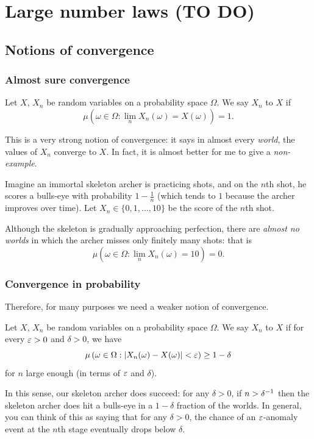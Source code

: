 \chapter{Large number laws (TO DO)}
\label{ch:large_number_laws}
\section{Notions of convergence}
\subsection{Almost sure convergence}
\begin{definition}
	Let $X$, $X_n$ be random variables on a probability space $\Omega$.
	We say $X_n$  to $X$ if
	\[ \mu \left( \omega \in \Omega :
		\lim_n X_n(\omega) = X(\omega) \right) = 1. \]
\end{definition}
This is a very strong notion of convergence:
it says in almost every \emph{world},
the values of $X_n$ converge to $X$.
In fact, it is almost better for me to give a \emph{non-example}.
\begin{example}
	Imagine an immortal skeleton archer is practicing shots,
	and on the $n$th shot, he scores a bulls-eye with probability
	$1 - \frac 1n$
	(which tends to $1$ because the archer improves over time).
	Let $X_n \in \{0, 1, \dots, 10\}$ be the score of the $n$th shot.

	Although the skeleton is gradually approaching perfection,
	there are \emph{almost no worlds} in which the archer
	misses only finitely many shots: that is
	\[ \mu \left( \omega \in \Omega :
		\lim_n X_n(\omega) = 10 \right) = 0. \]
\end{example}

\subsection{Convergence in probability}
Therefore, for many purposes we need a weaker notion of convergence.
\begin{definition}
	Let $X$, $X_n$ be random variables on a probability space $\Omega$.
	We say $X_n$  to $X$
	if for every $\varepsilon > 0$ and $\delta > 0$, we have
	\[ \mu \left( \omega \in \Omega :
			\left\lvert X_n(\omega) - X(\omega) \right\rvert < \varepsilon
		\right) \ge 1 - \delta  \]
	for $n$ large enough (in terms of $\varepsilon$ and $\delta$).
\end{definition}
In this sense, our skeleton archer does succeed:
for any $\delta > 0$, if $n > \delta^{-1}$
then the skeleton archer does hit a bulls-eye
in a $1-\delta$ fraction of the worlds.
In general, you can think of this as saying that for any $\delta > 0$,
the chance of an $\varepsilon$-anomaly event at the $n$th stage
eventually drops below $\delta$.


